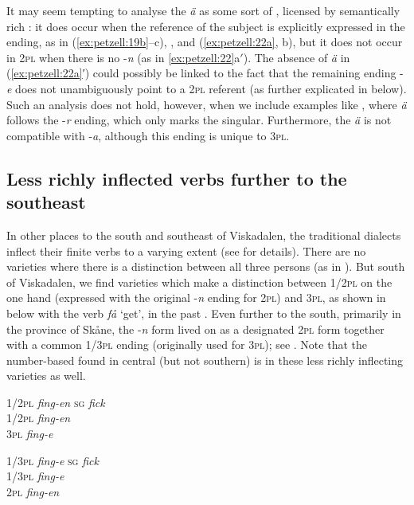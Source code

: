 \documentclass[output=paper,colorlinks,citecolor=brown,draft,draftmode]{langscibook}
\begin{document}
It may seem tempting to analyse the \textit{ä} as some sort of , licensed by semantically rich : it does occur when the reference of the subject is explicitly expressed in the ending, as in (\ref{ex:petzell:19b}–c), , and (\ref{ex:petzell:22a}, b), but it does not occur in 2\textsc{pl} when there is no -\textit{n} (as in \ref{ex:petzell:22}a$'$). The absence of \textit{ä} in (\ref{ex:petzell:22a}′) could possibly be linked to the fact that the remaining ending -\textit{e} does not unambiguously point to a 2\textsc{pl} referent (as further explicated in  below). Such an analysis does not hold, however, when we include examples like , where \textit{ä} follows the -\textit{r} ending, which only marks the singular. Furthermore, the \textit{ä} is not compatible with -\textit{a}, although this ending is unique to 3\textsc{pl}.


\subsection{Less richly inflected verbs further to the southeast}\label{sec:petzell:3.2}


In other places to the south and southeast of Viskadalen, the traditional dialects inflect their finite verbs to a varying extent (see \citealt{Horn2015,Horn2017} for details). There are no varieties where there is a distinction between all three persons (as in ). But south of Viskadalen, we find varieties which make a distinction between 1/2\textsc{pl} on the one hand (expressed with the original -\textit{n} ending for 2\textsc{pl}) and 3\textsc{pl}, as shown in  below with the verb \textit{få} ‘get’, in the past . Even further to the south, primarily in the province of Skåne, the -\textit{n} form lived on as a designated 2\textsc{pl} form together with a common 1/3\textsc{pl} ending (originally used for 3\textsc{pl}); see . Note that the number-based  found in central (but not southern)  is  in these less richly inflecting varieties as well.

\ea\label{ex:petzell:23}
\begin{multicols}{2}
\ea \label{ex:petzell:23a}\begin{tabbing}
    1/2\textsc{pl}  \=   \textit{fing-en}  \kill
    \textsc{sg}     \> \textit{fick}\\                          
    1/2\textsc{pl}  \>  \textit{fing-en}\\
    3\textsc{pl}    \>    \textit{fing-e}
    \end{tabbing}
\ex \label{ex:petzell:23b}\begin{tabbing}
   1/3\textsc{pl} \= \textit{fing-e}\kill
   \textsc{sg}    \> \textit{fick}\\
   1/3\textsc{pl} \> \textit{fing-e}\\
   2\textsc{pl}   \> \textit{fing-en}
   \end{tabbing}
\z
\end{multicols}
\z
\end{document}
